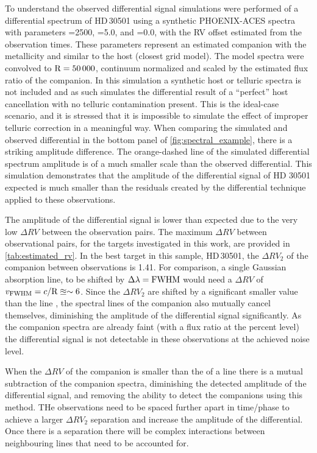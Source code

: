 To understand the observed differential signal simulations were performed of a differential spectrum of {HD\,30501} using a synthetic {PHOENIX-ACES} spectra with parameters \teff{}=2500\K{}, \logg{}=5.0, and \feh{}=0.0, with the {RV} offset estimated from the observation times.
These parameters represent an estimated companion \Teff{} with the metallicity and \logg{} similar to the host (closest grid model).
The model spectra were convolved to \(\textrm{R}=50\,000\), continuum normalized and scaled by the estimated flux ratio of the companion.
In this simulation a synthetic host or telluric spectra is not included and as such simulates the differential result of a ``perfect'' host cancellation with no telluric contamination present.
This is the ideal-case scenario, and it is stressed that it is impossible to simulate the effect of improper telluric correction in a meaningful way.
When comparing the simulated and observed differential in the bottom panel of \cref{fig:spectral_example}, there is a striking amplitude difference.
The orange-dashed line of the simulated differential spectrum amplitude is of a much smaller scale than the observed differential.
This simulation demonstrates that the amplitude of the differential signal of {HD 30501} expected is much smaller than the residuals created by the differential technique applied to these observations.

The amplitude of the differential signal is lower than expected due to the very low \(\Delta {RV}\) between the observation pairs.
The maximum \(\Delta {RV}\) between observational pairs, for the targets investigated in this work, are provided in \cref{tab:estimated_rv}.
In the best target in this sample, {HD\,30501}, the \(\Delta {RV}_2\) of the companion between observations is 1.41\kmps{}.
For comparison, a single Gaussian absorption line, to be shifted by \(\Delta\lambda = {\textrm{FWHM}}\) would need a \(\Delta {RV}\) of \(v_{\textrm{FWHM}} = c/\textrm{R} \approxeq\sim6\)\kmps{}.
Since the \(\Delta {RV}_2\) are shifted by a significant smaller value than the line {\fwhm}, the spectral lines of the companion also mutually cancel themselves, diminishing the amplitude of the differential signal significantly.
As the companion spectra are already faint (with a flux ratio at the percent level) the differential signal is not detectable in these observations at the achieved noise level.

When the \(\Delta {RV}\) of the companion is smaller than the {\fwhm} of a line there is a mutual subtraction of the companion spectra, diminishing the detected amplitude of the differential signal, and removing the ability to detect the companions using this method.
THe observations need to be spaced further apart in time/phase to achieve a larger \(\Delta {RV}_2\) separation and increase the amplitude of the differential.
Once there is a separation there will be complex interactions between neighbouring lines that need to be accounted for.


